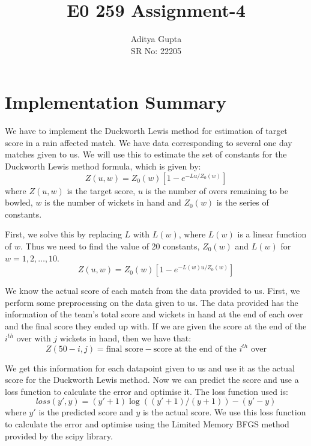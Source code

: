 \documentclass[12pt]{article}
\title{\vspace{-1.5cm}E0 259 Assignment-4}
\author{Aditya Gupta \\
SR No: 22205}
\date{}
\begin{document}
\maketitle

\section*{Implementation Summary}
We have to implement the Duckworth Lewis method for estimation of target score in a rain affected match. We have data corresponding to several one day matches given to us. We will use this to estimate the set of constants for the Duckworth Lewis method formula, which is given by:
\begin{equation*}
    Z(u, w) = Z_0(w)[1 - e^{-Lu/Z_0(w)}]
\end{equation*}
where $Z(u, w)$ is the target score, $u$ is the number of overs remaining to be bowled, $w$ is the number of wickets in hand and $Z_0(w)$ is the series of constants.

First, we solve this by replacing $L$ with $L(w)$, where $L(w)$ is a linear function of $w$. Thus we need to find the value of 20 constants, $Z_0(w)$ and $L(w)$ for $w = 1, 2, \ldots, 10$.
\begin{equation*}
    Z(u, w) = Z_0(w)[1 - e^{-L(w)u/Z_0(w)}]
\end{equation*}

We know the actual score of each match from the data provided to us. First, we perform some preprocessing on the data given to us. The data provided has the information of the team's total score and wickets in hand at the end of each over and the final score they ended up with. If we are given the score at the end of the $i^{th}$ over with $j$ wickets in hand, then we have that:
\begin{equation*}
    Z(50 - i, j) = \text{final score} - \text{score at the end of the } i^{th} \text{ over} 
\end{equation*}

We get this information for each datapoint given to us and use it as the actual score for the Duckworth Lewis method. Now we can predict the score and use a loss function to calculate the error and optimise it. The loss function used is:
\begin{equation*}
    loss(y', y) = (y' + 1) \log((y' + 1)/(y + 1)) - (y' - y)
\end{equation*}
where $y'$ is the predicted score and $y$ is the actual score. We use this loss function to calculate the error and optimise using the Limited Memory BFGS method provided by the scipy library.
\end{document}
